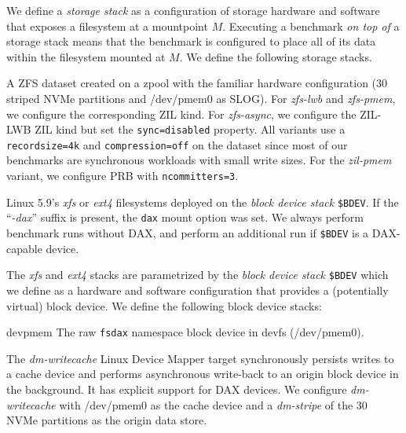 \documentclass[12pt,a4paper,twoside]{book}
\begin{document}
{We define a \textit{storage stack} as a configuration of storage hardware and software that exposes a filesystem at a mountpoint $M$.
Executing a benchmark \textit{on top of} a storage stack means that the benchmark is configured to place all of its data within the filesystem mounted at $M$.
We define the following storage stacks.
\begin{description}[noitemsep,leftmargin=1.5cm,labelindent=1cm]
    \item[zfs-\{lwb,pmem,async\}] A \underline{} ZFS dataset created on a zpool with the familiar hardware configuration (30 striped NVMe partitions and /dev/pmem0 as SLOG).
        For \textit{zfs-lwb} and \textit{zfs-pmem}, we configure the corresponding ZIL kind.
        For \textit{zfs-async}, we configure the ZIL-LWB ZIL kind but set the \lstinline{sync=disabled} property.
        All variants use a \lstinline{recordsize=4k} and \lstinline{compression=off} on the dataset since most of our benchmarks are synchronous workloads with small write sizes.
        For the \textit{zil-pmem} variant, we configure PRB with \lstinline{ncommitters=3}.
    \item[\{xfs,ext4\}\{,-dax\} on \$BDEV] Linux 5.9's \textit{xfs} or \textit{ext4} filesystems deployed on the \textit{block device stack} \lstinline{$BDEV}.
        If the ``\textit{-dax}'' suffix is present, the \lstinline{dax} mount option was set.
        We always perform benchmark runs without DAX, and perform an additional run if \lstinline{$BDEV} is a DAX-capable device.
\end{description}
The \textit{xfs} and \textit{ext4} stacks are parametrized by the \textit{block device stack} \lstinline{$BDEV} which we define as a hardware and software configuration that provides a (potentially virtual) block device.
We define the following block device stacks:
\begin{description}[noitemsep,leftmargin=1.5cm,labelindent=1cm]
    \item[devpmem] The raw \lstinline{fsdax} namespace block device in devfs (/dev/pmem0).
    \item[dm-writecache]
        The \textit{dm-writecache} Linux Device Mapper target synchro\-nously persists writes to a cache device and performs asynchronous write-back to an origin block device in the background.
        It has explicit support for DAX devices.
        We configure \textit{dm-writecache} with \mbox{/dev/pmem0} as the cache device and a \textit{dm-stripe} of the 30 NVMe partitions as the origin data store.

\end{description}}
\end{document}
